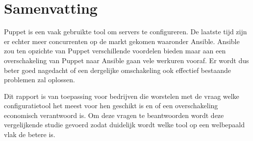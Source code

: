 





\chapter*{Samenvatting}
Puppet is een vaak gebruikte tool om servers te configureren. De laatste tijd zijn er echter meer concurrenten op de markt gekomen waaronder Ansible. Ansible zou ten opzichte van Puppet verschillende voordelen bieden maar aan een overschakeling van Puppet naar Ansible gaan vele werkuren vooraf. Er wordt dus beter goed nagedacht of een dergelijke omschakeling ook effectief bestaande problemen zal oplossen.


Dit rapport is van toepassing voor bedrijven die worstelen met de vraag welke configuratietool het meest voor hen geschikt is en of een overschakeling economisch verantwoord is. Om deze vragen te beantwoorden wordt deze vergelijkende studie gevoerd zodat duidelijk wordt welke tool op een welbepaald vlak de betere is.

